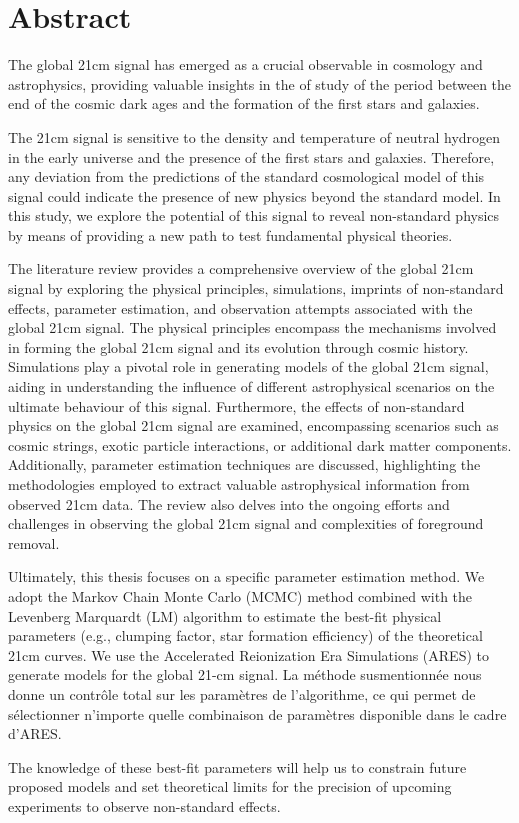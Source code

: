 \documentclass[12pt, TexShade, letterpaper]{report}
\begin{document}
\chapter*{Abstract}
	\label{chap:engAbstract}
The global 21cm signal has emerged as a crucial observable in cosmology and astrophysics, providing valuable insights in the of study of the period between the end of the cosmic dark ages and the formation of the first stars and galaxies.\par
The 21cm signal is sensitive to the density and temperature of neutral hydrogen in the early universe and the presence of the first stars and galaxies. Therefore, any deviation from the predictions of the standard cosmological model of this signal could indicate the presence of new physics beyond the standard model. In this study, we explore the potential of this signal to reveal non-standard physics by means of providing a new path to test fundamental physical theories. \par
The literature review  provides a comprehensive overview of the global 21cm signal by exploring the physical principles, simulations, imprints of non-standard effects, parameter estimation, and observation attempts associated with the global 21cm signal. The physical principles encompass the mechanisms involved in forming the global 21cm signal and its evolution through cosmic history. Simulations play a pivotal role in generating models of the global 21cm signal, aiding in understanding the influence of different astrophysical scenarios on the ultimate behaviour of this signal. Furthermore, the effects of non-standard physics on the global 21cm signal are examined, encompassing scenarios such as cosmic strings, exotic particle interactions, or additional dark matter components. Additionally, parameter estimation techniques are discussed, highlighting the methodologies employed to extract valuable astrophysical information from observed 21cm data. The review also delves into the ongoing efforts and challenges in observing the global 21cm signal and complexities of foreground removal.\par
Ultimately, this thesis focuses on a specific parameter estimation method. We adopt the Markov Chain Monte Carlo (MCMC) method combined with the Levenberg Marquardt (LM) algorithm to estimate the best-fit physical parameters (e.g., clumping factor, star formation efficiency) of the theoretical 21cm curves. We use the Accelerated Reionization Era Simulations (ARES) to generate models for the global 21-cm signal. La méthode susmentionnée nous donne un contrôle total sur les paramètres de l'algorithme, ce qui permet de sélectionner n'importe quelle combinaison de paramètres disponible dans le cadre d'ARES.\par
The knowledge of these best-fit parameters will help us to constrain future proposed models and set theoretical limits for the precision of upcoming experiments to observe non-standard effects.\par
\end{document}
